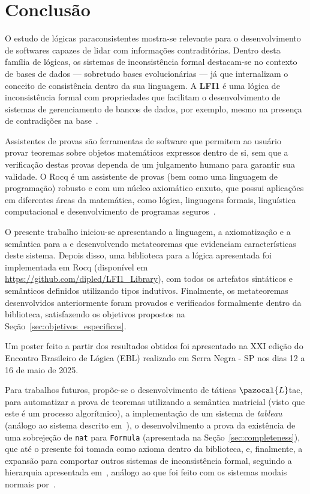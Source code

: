 \chapter{Conclusão}\label{chap:conclusao}

O estudo de lógicas paraconsistentes mostra-se relevante para o desenvolvimento de softwares capazes de lidar com informações contraditórias. Dentro desta família de lógicas, os sistemas de inconsistência formal destacam-se no contexto de bases de dados {---} sobretudo bases evolucionárias {---} já que internalizam o conceito de consistência dentro da sua linguagem. A \textbf{LFI1} é uma lógica de inconsistência formal com propriedades que facilitam o desenvolvimento de sistemas de gerenciamento de bancos de dados, por exemplo, mesmo na presença de contradições na base~\cite{carnielli2000formal}.

Assistentes de provas são ferramentas de software que permitem ao usuário provar teoremas sobre objetos matemáticos expressos dentro de si, sem que a verificação destas provas dependa de um julgamento humano para garantir sua validade. O Rocq é um assistente de provas (bem como uma linguagem de programação) robusto e com um núcleo axiomático enxuto, que possui aplicações em diferentes áreas da matemática, como lógica, linguagens formais, linguística computacional e desenvolvimento de programas seguros~\cite{coqart}.

O presente trabalho iniciou-se apresentando a linguagem, a axiomatização e a semântica para a \lfium{} e desenvolvendo metateoremas que evidenciam características deste sistema. Depois disso, uma biblioteca para a lógica apresentada foi implementada em Rocq (disponível em \url{https://github.com/dipled/LFI1_Library}), com todos os artefatos sintáticos e semânticos definidos utilizando tipos indutivos. Finalmente, os metateoremas desenvolvidos anteriormente foram provados e verificados formalmente dentro da biblioteca, satisfazendo os objetivos propostos na Seção~\ref{sec:objetivos_especificos}.

Um poster feito a partir dos resultados obtidos foi apresentado na XXI edição do Encontro Brasileiro de Lógica (EBL) realizado em Serra Negra {-} SP nos dias 12 a 16 de maio de 2025.

Para trabalhos futuros, propõe-se o desenvolvimento de táticas $\pazocal{L}$tac, para automatizar a prova de teoremas utilizando a semântica matricial (visto que este é um processo algorítmico), a implementação de um sistema de \textit{tableau} (análogo ao sistema descrito em~\cite{tableaulfi}), o desenvolvilmento a prova da existência de uma sobrejeção de \texttt{nat} para \texttt{Formula} (apresentada na Seção~\ref{sec:completeness}), que até o presente foi tomada como axioma dentro da biblioteca, e, finalmente, a expansão para comportar outros sistemas de inconsistência formal, seguindo a hierarquia apresentada em~\cite{Carnielli_Coniglio_2016}, análogo ao que foi feito com os sistemas modais normais por~.